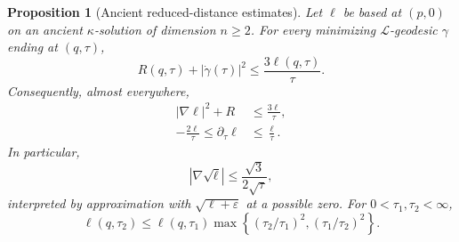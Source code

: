 \documentclass[10pt]{coll-l}
\newtheorem{proposition}[theorem]{Proposition}
\theoremstyle{definition}
\theoremstyle{remark}
\numberwithin{section}{chapter}
\numberwithin{equation}{chapter}
\begin{document}
\begin{proposition}[Ancient reduced-distance estimates]
\label{prop:red-ancient-ell-estimates}
Let $\ell$ be based at $(p,0)$ on an ancient $\kappa$-solution of dimension
$n\geq2$.  For every minimizing $\mathcal L$-geodesic $\gamma$ ending at
$(q,\tau)$,
\begin{equation}
       R(q,\tau)+|\dot\gamma(\tau)|^2
       \leq\frac{3\ell(q,\tau)}\tau.                   \label{eq:red-ancient-endpoint-estimate}
\end{equation}
Consequently, almost everywhere,
\begin{align}
 |\nabla\ell|^2+R&\leq\frac{3\ell}\tau,                 \label{eq:red-ancient-gradient-estimate}\\
 -\frac{2\ell}\tau\leq\partial_\tau\ell
       &\leq\frac\ell\tau.                             \label{eq:red-ancient-time-estimate}
\end{align}
In particular,
\begin{equation}
       |\nabla\sqrt\ell|\leq\frac{\sqrt3}{2\sqrt\tau},
                                                               \label{eq:red-sqrt-ell-gradient}
\end{equation}
interpreted by approximation with $\sqrt{\ell+\varepsilon}$ at a possible
zero.  For $0<\tau_1,\tau_2<\infty$,
\begin{equation}
 \ell(q,\tau_2)
 \leq\ell(q,\tau_1)
        \max\left\{(\tau_2/\tau_1)^2,
                    (\tau_1/\tau_2)^2\right\}.          \label{eq:red-ell-time-ratio}
\end{equation}
\end{proposition}
\end{document}
